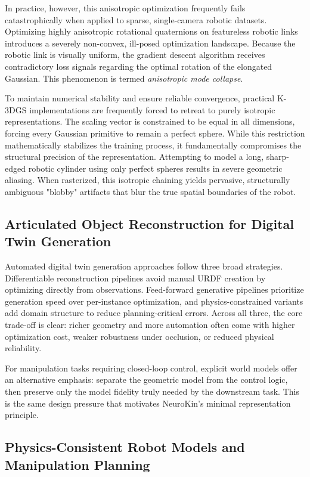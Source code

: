 \documentclass[12pt,a4paper,oneside]{report}
\begin{document}
In practice, however, this anisotropic optimization frequently fails catastrophically when applied to sparse, single-camera robotic datasets. Optimizing highly anisotropic rotational quaternions on featureless robotic links introduces a severely non-convex, ill-posed optimization landscape. Because the robotic link is visually uniform, the gradient descent algorithm receives contradictory loss signals regarding the optimal rotation of the elongated Gaussian. This phenomenon is termed \textit{anisotropic mode collapse}.

To maintain numerical stability and ensure reliable convergence, practical K-3DGS implementations are frequently forced to retreat to purely isotropic representations. The scaling vector is constrained to be equal in all dimensions, forcing every Gaussian primitive to remain a perfect sphere. While this restriction mathematically stabilizes the training process, it fundamentally compromises the structural precision of the representation. Attempting to model a long, sharp-edged robotic cylinder using only perfect spheres results in severe geometric aliasing. When rasterized, this isotropic chaining yields pervasive, structurally ambiguous "blobby" artifacts that blur the true spatial boundaries of the robot.

\subsection{Articulated Object Reconstruction for Digital Twin Generation}

Automated digital twin generation approaches follow three broad strategies. Differentiable reconstruction pipelines avoid manual URDF creation by optimizing directly from observations. Feed-forward generative pipelines prioritize generation speed over per-instance optimization, and physics-constrained variants add domain structure to reduce planning-critical errors. Across all three, the core trade-off is clear: richer geometry and more automation often come with higher optimization cost, weaker robustness under occlusion, or reduced physical reliability.

For manipulation tasks requiring closed-loop control, explicit world models offer an alternative emphasis: separate the geometric model from the control logic, then preserve only the model fidelity truly needed by the downstream task. This is the same design pressure that motivates NeuroKin's minimal representation principle.

\subsection{Physics-Consistent Robot Models and Manipulation Planning}
\end{document}
